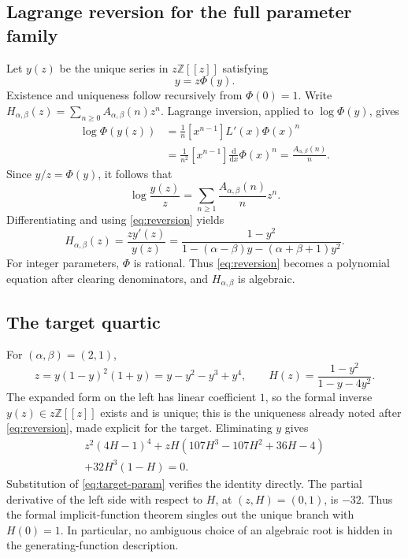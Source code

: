 \documentclass[11pt,a4paper]{article}
\numberwithin{equation}{section}
\theoremstyle{definition}
\theoremstyle{remark}
\newcommand{\Z}{\mathbb Z}
\newcommand{\A}{A_{\alpha,\beta}}
\begin{document}
\subsection{Lagrange reversion for the full parameter family}
Let $y(z)$ be the unique series in $z\Z[[z]]$ satisfying
\begin{equation}\label{eq:reversion}
 y=z\Phi(y).
\end{equation}
Existence and uniqueness follow recursively from $\Phi(0)=1$. Write
$H_{\alpha,\beta}(z)=\sum_{n\ge0}\A(n)z^n$.
Lagrange inversion, applied to $\log\Phi(y)$, gives
\begin{align*}
 [z^n]\log\Phi(y(z))
 &=\frac1n[x^{n-1}]L'(x)\Phi(x)^n\\
 &=\frac1{n^2}[x^{n-1}]\frac{\mathrm d}{\mathrm dx}\Phi(x)^n
 =\frac{\A(n)}n.
\end{align*}
Since $y/z=\Phi(y)$, it follows that
\begin{equation}\label{eq:log-y}
 \log\frac{y(z)}z=\sum_{n\ge1}\frac{\A(n)}n z^n.
\end{equation}
Differentiating and using \eqref{eq:reversion} yields
\begin{equation}\label{eq:Hparam}
 H_{\alpha,\beta}(z)=\frac{zy'(z)}{y(z)}
 =\frac{1-y^2}
 {1-(\alpha-\beta)y-(\alpha+\beta+1)y^2}.
\end{equation}
For integer parameters, $\Phi$ is rational. Thus \eqref{eq:reversion}
becomes a polynomial equation after clearing denominators, and
$H_{\alpha,\beta}$ is algebraic.

\subsection{The target quartic}
For $(\alpha,\beta)=(2,1)$,
\begin{equation}\label{eq:target-param}
 z=y(1-y)^2(1+y)=y-y^2-y^3+y^4,\qquad
 H(z)=\frac{1-y^2}{1-y-4y^2}.
\end{equation}
The expanded form on the left has linear coefficient $1$, so the formal
inverse $y(z)\in z\Z[[z]]$ exists and is unique; this is the uniqueness
already noted after \eqref{eq:reversion}, made explicit for the target.
Eliminating $y$ gives
\begin{equation}\label{eq:quartic}
 \begin{split}
 z^2(4H-1)^4
 +zH(107H^3-107H^2+36H-4)\\
 +32H^3(1-H)=0.
 \end{split}
\end{equation}
Substitution of \eqref{eq:target-param} verifies the identity directly.
The partial derivative of the left side with respect to $H$, at
$(z,H)=(0,1)$, is $-32$. Thus the formal implicit-function theorem singles
out the unique branch with $H(0)=1$. In particular, no ambiguous choice of
an algebraic root is hidden in the generating-function description.
\end{document}
